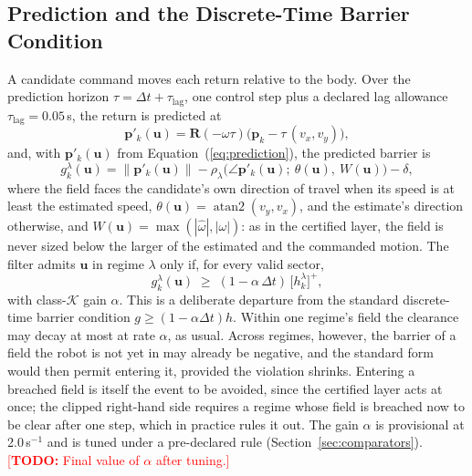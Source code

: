 \documentclass[sensors,article,submit,moreauthors]{Definitions/mdpi}
\newcommand{\todo}[1]{\textcolor{red}{[\textbf{TODO:} #1]}}
\begin{document}
\subsection{Prediction and the Discrete-Time Barrier Condition}\label{sec:cbf}

A candidate command moves each return relative to the body. Over the prediction horizon $\tau = \Delta t + \tau_{\text{lag}}$, one control step plus a declared lag allowance $\tau_{\text{lag}} = 0.05$\,s, the return is predicted at
\begin{equation}
\mathbf{p}'_k(\mathbf{u}) = \mathbf{R}(-\omega\tau)\big(\mathbf{p}_k - \tau\,(v_x, v_y)\big),
\label{eq:prediction}
\end{equation}
and, with $\mathbf{p}'_k(\mathbf{u})$ from Equation~(\ref{eq:prediction}), the predicted barrier is
\begin{equation}
g^\lambda_k(\mathbf{u}) = \|\mathbf{p}'_k(\mathbf{u})\| - \rho_\lambda\big(\angle\mathbf{p}'_k(\mathbf{u});\ \theta(\mathbf{u}),\ W(\mathbf{u})\big) - \delta,
\label{eq:predicted}
\end{equation}
where the field faces the candidate's own direction of travel when its speed is at least the estimated speed, $\theta(\mathbf{u}) = \operatorname{atan2}(v_y, v_x)$, and the estimate's direction otherwise, and $W(\mathbf{u}) = \max(|\hat\omega|, |\omega|)$: as in the certified layer, the field is never sized below the larger of the estimated and the commanded motion. The filter admits $\mathbf{u}$ in regime $\lambda$ only if, for every valid sector,
\begin{equation}
g^\lambda_k(\mathbf{u}) \;\ge\; (1 - \alpha\,\Delta t)\,\big[h^\lambda_k\big]^+ ,
\label{eq:cbf}
\end{equation}
with class-$\mathcal{K}$ gain $\alpha$. This is a deliberate departure from the standard discrete-time barrier condition $g \ge (1-\alpha\Delta t)h$. Within one regime's field the clearance may decay at most at rate $\alpha$, as usual. Across regimes, however, the barrier of a field the robot is not yet in may already be negative, and the standard form would then permit entering it, provided the violation shrinks. Entering a breached field is itself the event to be avoided, since the certified layer acts at once; the clipped right-hand side requires a regime whose field is breached now to be clear after one step, which in practice rules it out. The gain $\alpha$ is provisional at 2.0\,s$^{-1}$ and is tuned under a pre-declared rule (Section~\ref{sec:comparators}). \todo{Final value of $\alpha$ after tuning.}
\end{document}
